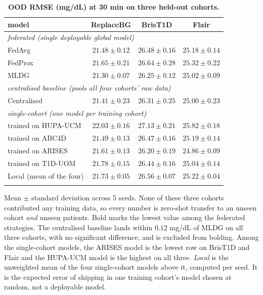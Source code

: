 \documentclass[10pt,letterpaper]{article}
\newlength\savedwidth
\newcommand\thickhline{\noalign{\global\savedwidth\arrayrulewidth\global\arrayrulewidth 2pt}%
\hline
\noalign{\global\arrayrulewidth\savedwidth}}
\begin{document}
\begin{table}[!ht]
\centering
\captionsetup{justification=centering,singlelinecheck=on}
\caption{\bf OOD RMSE (mg/dL) at 30 min on three held-out cohorts.}
\label{tab:ood}
\begin{tabular}{lccc}
\thickhline
model & ReplaceBG & BrisT1D & Flair \\
\hline
\multicolumn{4}{l}{\emph{federated (single deployable global model)}} \\
FedAvg  & $21.48 \pm 0.12$ & $26.48 \pm 0.16$ & $25.18 \pm 0.14$ \\
FedProx & $21.65 \pm 0.21$ & $26.64 \pm 0.28$ & $25.32 \pm 0.22$ \\
MLDG    & $\mathbf{21.30 \pm 0.07}$ & $\mathbf{26.25 \pm 0.12}$ & $\mathbf{25.02 \pm 0.09}$ \\
\hline
\multicolumn{4}{l}{\emph{centralised baseline (pools all four cohorts' raw data)}} \\
Centralised & $21.41 \pm 0.23$ & $26.31 \pm 0.25$ & $25.00 \pm 0.23$ \\
\hline
\multicolumn{4}{l}{\emph{single-cohort (one model per training cohort)}} \\
\;trained on HUPA-UCM & $22.03 \pm 0.16$ & $27.13 \pm 0.21$ & $25.82 \pm 0.18$ \\
\;trained on ABC4D    & $21.49 \pm 0.13$ & $26.47 \pm 0.16$ & $25.19 \pm 0.14$ \\
\;trained on ARISES   & $21.61 \pm 0.13$ & $26.20 \pm 0.19$ & $24.86 \pm 0.09$ \\
\;trained on T1D-UOM  & $21.78 \pm 0.15$ & $26.44 \pm 0.16$ & $25.04 \pm 0.14$ \\
Local (mean of the four) & $21.73 \pm 0.05$ & $26.56 \pm 0.07$ & $25.22 \pm 0.04$ \\
\thickhline
\end{tabular}
\begin{center}
{\small Mean $\pm$ standard deviation across 5 seeds. None of these three cohorts
contributed any training data, so every number is zero-shot transfer to an unseen
cohort \emph{and} unseen patients. Bold marks the lowest value among the
federated strategies. The centralised baseline lands within $0.12$ mg/dL of
MLDG on all three cohorts, with no significant difference, and is excluded
from bolding. Among the single-cohort models, the ARISES model is the lowest
row on BrisT1D and Flair and the HUPA-UCM model is the highest on all three.
\emph{Local} is the unweighted mean of the four single-cohort models above it,
computed per seed. It is the expected error of shipping in one training
cohort's model chosen at random, not a deployable model.}
\end{center}
\end{table}
\end{document}
